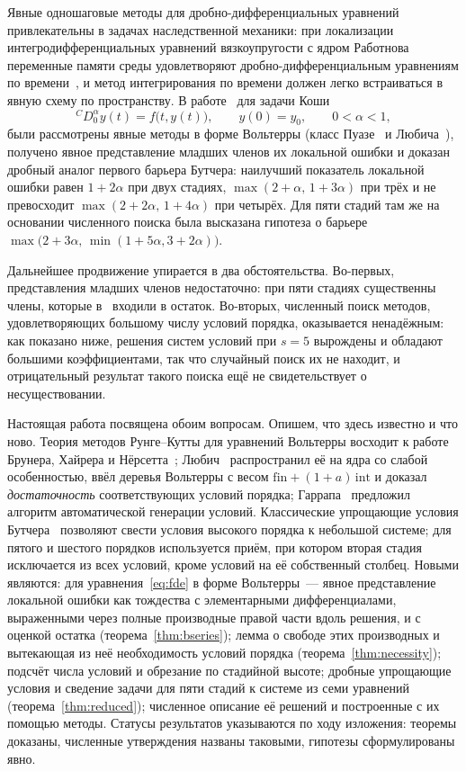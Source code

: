 \documentclass[11pt,a4paper]{article}
\theoremstyle{plain}
\theoremstyle{definition}
\begin{document}
Явные одношаговые методы для дробно-дифференциальных уравнений привлекательны в задачах наследственной механики: при локализации интегродифференциальных уравнений вязкоупругости с ядром Работнова переменные памяти среды удовлетворяют дробно-дифференциальным уравнениям по времени~\cite{PP2026zhvm,Prik2026de}, и метод интегрирования по времени должен легко встраиваться в явную схему по пространству. В работе~\cite{PrikBarriers} для задачи Коши
\begin{equation}\label{eq:fde}
{}^{C}\!D^{\alpha}_{0}y(t)=f\bigl(t,y(t)\bigr),\qquad y(0)=y_0,\qquad 0<\alpha<1,
\end{equation}
были рассмотрены явные методы в форме Вольтерры (класс Пуазе~\cite{Pouzet1960} и Любича~\cite{Lubich1983}), получено явное представление младших членов их локальной ошибки и доказан дробный аналог первого барьера Бутчера: наилучший показатель локальной ошибки равен $1+2\alpha$ при двух стадиях, $\max(2+\alpha,\,1+3\alpha)$ при трёх и не превосходит $\max(2+2\alpha,\,1+4\alpha)$ при четырёх. Для пяти стадий там же на основании численного поиска была высказана гипотеза о барьере $\max\bigl(2+3\alpha,\,\min(1+5\alpha,3+2\alpha)\bigr)$.

Дальнейшее продвижение упирается в два обстоятельства. Во-первых, представления младших членов недостаточно: при пяти стадиях существенны члены, которые в~\cite{PrikBarriers} входили в остаток. Во-вторых, численный поиск методов, удовлетворяющих большому числу условий порядка, оказывается ненадёжным: как показано ниже, решения систем условий при $s=5$ вырождены и обладают большими коэффициентами, так что случайный поиск их не находит, и отрицательный результат такого поиска ещё не свидетельствует о несуществовании.

Настоящая работа посвящена обоим вопросам. Опишем, что здесь известно и что ново. Теория методов Рунге--Кутты для уравнений Вольтерры восходит к работе Брунера, Хайрера и Нёрсетта~\cite{BHN1982}; Любич~\cite{Lubich1983} распространил её на ядра со слабой особенностью, ввёл деревья Вольтерры с весом $\mathrm{fin}+(1+a)\,\mathrm{int}$ и доказал \emph{достаточность} соответствующих условий порядка; Гаррапа~\cite{Garrappa2010} предложил алгоритм автоматической генерации условий. Классические упрощающие условия Бутчера~\cite{Butcher1964,Butcher2016,HNW1993} позволяют свести условия высокого порядка к небольшой системе; для пятого и шестого порядков используется приём, при котором вторая стадия исключается из всех условий, кроме условий на её собственный столбец. Новыми являются: для уравнения~\eqref{eq:fde} в форме Вольтерры~--- явное представление локальной ошибки как тождества с элементарными дифференциалами, выраженными через полные производные правой части вдоль решения, и с оценкой остатка (теорема~\ref{thm:bseries}); лемма о свободе этих производных и вытекающая из неё необходимость условий порядка (теорема~\ref{thm:necessity}); подсчёт числа условий и обрезание по стадийной высоте; дробные упрощающие условия и сведение задачи для пяти стадий к системе из семи уравнений (теорема~\ref{thm:reduced}); численное описание её решений и построенные с их помощью методы. Статусы результатов указываются по ходу изложения: теоремы доказаны, численные утверждения названы таковыми, гипотезы сформулированы явно.
\end{document}
